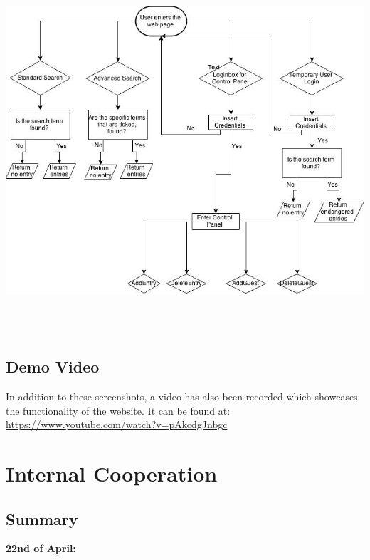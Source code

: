 \documentclass[12pt,a4paper]{article}
\begin{document}
\includegraphics[height=135mm]{Flowchart.png}

\subsection{Demo Video}
In addition to these screenshots, a video has also been recorded which showcases the functionality of the website. It can be found at: \url{https://www.youtube.com/watch?v=pAkcdgJnbgc}



\newpage

\section{Internal Cooperation}
\subsection{Summary}

{\bf 22nd of April:}
\end{document}
